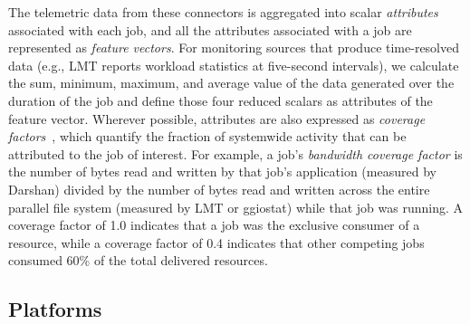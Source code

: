 The telemetric data from these connectors is aggregated into scalar \emph{attributes} associated with each job, and all  the attributes associated with a job are represented as \emph{feature vectors}.
For monitoring sources that produce time-resolved data (e.g., LMT reports workload statistics at five-second intervals), we calculate the sum, minimum, maximum, and average value of the data generated over the duration of the job and define those four reduced scalars as attributes of the feature vector.
Wherever possible, attributes are also expressed as \emph{coverage factors}~\cite{Lockwood2017}, which quantify the fraction of systemwide activity that can be attributed to the job of interest.
For example, a job's \emph{bandwidth coverage factor} is the number of bytes read and written by that job's application (measured by Darshan) divided by the number of bytes read and written across the entire parallel file system (measured by LMT or ggiostat) while that job was running.
A coverage factor of 1.0 indicates that a job was the exclusive consumer of
a resource, while a coverage factor of 0.4 indicates that other competing
jobs consumed 60\% of the total delivered resources.


\subsection{Platforms}\label{sec:methods/platforms}

